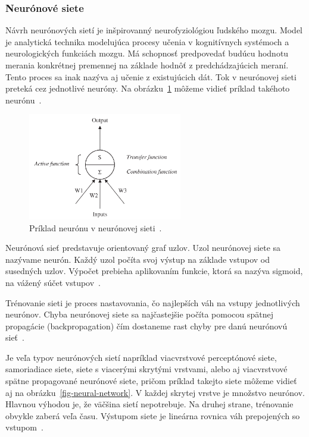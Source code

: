 \documentclass[a4paper,slovak,12pt,appendix]{article}
\begin{document}

\subsubsection{Neurónové siete}
Návrh neurónových sietí je inšpirovanný neurofyziológiou ľudského mozgu. Model
je analytická technika modelujúca procesy učenia v kognitívnych systémoch
a neurologických funkciách mozgu. Má schopnosť predpovedať budúcu hodnotu
merania konkrétnej premennej na základe hodnôť z predchádzajúcich meraní. Tento
proces sa inak nazýva aj učenie z existujúcich dát. Tok v neurónovej sieti
preteká cez jednotlivé neuróny. Na obrázku~\ref{fig-neuron} môžeme vidieť
príklad takéhoto neurónu~\cite{Tso2007}.

\begin{figure}[!ht]
  \centering
  \includegraphics[width=0.6\textwidth]{neuron.png}
  \caption{Príklad neurónu v neurónovej sieti~\cite{Tso2007}.}
  \label{fig-neuron}
\end{figure}

Neurónová sieť predstavuje orientovaný graf uzlov. Uzol neurónovej
siete sa nazývame neurón. Každý uzol počíta svoj výstup na základe vstupov od
susedných uzlov. Výpočet prebieha aplikovaním funkcie, ktorá sa nazýva sigmoid,
na vážený súčet vstupov~\cite{Gruau1994}.

Trénovanie sieti je proces nastavovania, čo najlepších váh na vstupy
jednotlivých neurónov. Chyba neurónovej siete sa najčastejšie počíta pomocou
spätnej propagácie (backpropagation) čím dostaneme rast chyby pre danú
neurónovú sieť~\cite{Tso2007}.

Je veľa typov neurónových sietí napríklad viacvrstvové perceptónové siete,
samoriadiace siete, siete s viacerými skrytými vrstvami, alebo aj viacvrstvové
spätne propagované neurónové siete, pričom príklad takejto siete môžeme vidieť
aj na obrázku~\ref{fig-neural-network}. V každej skrytej vrstve je množstvo
neurónov. Hlavnou výhodou je, že väčšina sietí nepotrebuje. Na druhej strane,
trénovanie obvykle zaberá veľa času. Výstupom siete je lineárna rovnica váh
prepojených so vstupom~\cite{KumarSingh2013}.
\end{document}
